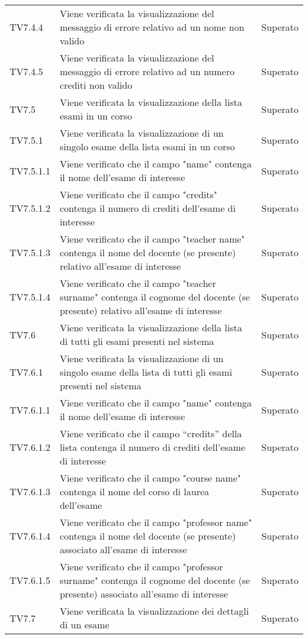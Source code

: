 \documentclass[PianoDiQualifica.tex]{subfiles}
\begin{document}
\begin{longtable}[H]{P{2cm}P{8.5cm}P{3cm}}
	TV7.4.4 & Viene verificata la visualizzazione del messaggio di errore relativo ad un nome non valido & Superato \\ 
	TV7.4.5 & Viene verificata la visualizzazione del messaggio di errore relativo ad un numero crediti non valido & Superato \\ 
	TV7.5 & Viene verificata la visualizzazione della lista esami in un corso & Superato \\ 
	TV7.5.1 & Viene verificata la visualizzazione di un singolo esame della lista esami in un corso & Superato \\ 
	TV7.5.1.1 & Viene verificato che il campo "name" contenga il nome dell'esame di interesse & Superato \\ 
	TV7.5.1.2 & Viene verificato che il campo "credits" contenga il numero di crediti dell'esame di interesse & Superato \\ 
	TV7.5.1.3 & Viene verificato che il campo "teacher name" contenga il nome del docente (se presente) relativo all'esame di interesse & Superato \\ 
	TV7.5.1.4 & Viene verificato che il campo "teacher surname" contenga il cognome del docente (se presente) relativo all'esame di interesse & Superato \\ 
	TV7.6 & Viene verificata la visualizzazione della lista di tutti gli esami presenti nel sistema & Superato \\ 
	TV7.6.1 & Viene verificata la visualizzazione di un singolo esame della lista di tutti gli esami presenti nel sistema & Superato \\ 
	TV7.6.1.1 & Viene verificato che il campo "name" contenga il nome dell'esame di interesse & Superato \\ 
	TV7.6.1.2 & Viene verificato che il campo “credits” della lista contenga il numero di crediti dell'esame di interesse & Superato \\ 
	TV7.6.1.3 & Viene verificato che il campo "course name" contenga il nome del corso di laurea dell'esame & Superato \\ 
	TV7.6.1.4 & Viene verificato che il campo "professor name" contenga il nome del docente (se presente) associato all'esame di interesse & Superato \\ 
	TV7.6.1.5 & Viene verificato che il campo "professor surname" contenga il cognome del docente (se presente) associato all'esame di interesse & Superato \\ 
	TV7.7 & Viene verificata la visualizzazione dei dettagli di un esame & Superato \\ 

\end{longtable}
\end{document}

